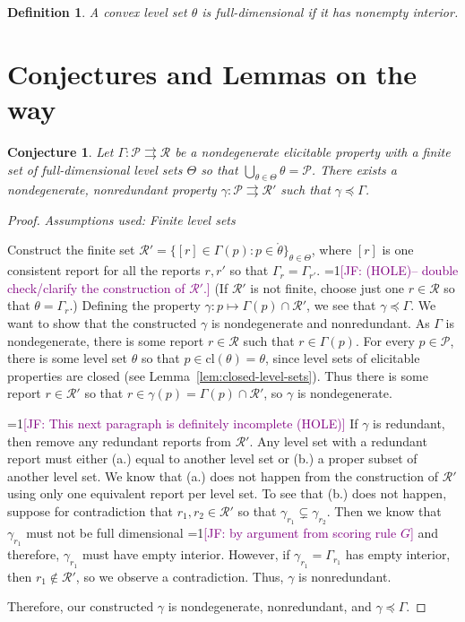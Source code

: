 \documentclass[12pt]{article}
\newcommand{\Comments}{1}
\newcommand{\mynote}[2]{\ifnum\Comments=1\textcolor{#1}{#2}\fi}
\newcommand{\jessie}[1]{\mynote{purple}{[JF: #1]}}
\renewcommand{\P}{\mathcal{P}}
\newcommand{\R}{\mathcal{R}}
\newcommand{\inter}[1]{\mathring{#1}}%
\newcommand{\cl}[1]{\text{cl}(#1)}
\newcommand{\toto}{\rightrightarrows}
\newtheorem{definition}{Definition}
\newtheorem{conjecture}{Conjecture}
\begin{document}
\begin{definition}
	A convex level set $\theta$ is \emph{full-dimensional} if it has nonempty interior.
\end{definition}



\section{Conjectures and Lemmas on the way}

\begin{conjecture}\label{conj:gam-prime-exists}
	Let $\Gamma:\P \toto \R$ be a nondegenerate elicitable property with a finite set of full-dimensional level sets $\Theta$ so that $\bigcup_{\theta \in \Theta}\theta = \P$.
	There exists a nondegenerate, nonredundant property $\gamma: \P \toto \R'$ such that $\gamma \preceq \Gamma$. 
\end{conjecture}
\begin{proof}
\emph{Assumptions used: Finite level sets}

	
	Construct the finite set $\R' = \{[r] \in \Gamma(p) : p \in \inter{\theta} \}_{\theta \in \Theta}$, where $[r]$ is one consistent report for all the reports $r, r'$ so that $\Gamma_r = \Gamma_{r'}$. 
	\jessie{(HOLE)-- double check/clarify the construction of $\R'$.}
	(If $\R'$ is not finite, choose just one $r \in \R$ so that $\theta = \Gamma_r$.)
	Defining the property $\gamma : p \mapsto \Gamma(p) \cap \R'$, we see that $\gamma \preceq \Gamma$.
	We want to show that the constructed $\gamma$ is nondegenerate and nonredundant.
	As $\Gamma$ is nondegenerate, there is some report $r \in \R$ such that $r \in \Gamma(p)$.
	For every $p \in \P$, there is some level set $\theta$ so that $p \in \cl{\theta} = \theta$, since level sets of elicitable properties are closed (see Lemma~\ref{lem:closed-level-sets}).
	Thus there is some report $r \in \R'$ so that $r \in \gamma(p) = \Gamma(p) \cap \R'$, so $\gamma$ is nondegenerate.

	\jessie{This next paragraph is definitely incomplete (HOLE)}
	If $\gamma$ is redundant, then remove any redundant reports from $\R'$.
	Any level set with a redundant report must either (a.) equal to another level set or (b.) a proper subset of another level set. 
	We know that (a.) does not happen from the construction of $\R'$ using only one equivalent report per level set.
	To see that (b.) does not happen, suppose for contradiction that $r_1, r_2 \in \R'$ so that $\gamma_{r_1}\subsetneq \gamma_{r_2}$.
	Then we know that $\gamma_{r_1}$ must not be full dimensional \jessie{by argument from scoring rule $G$} and therefore, $\gamma_{r_1}$ must have empty interior.
	However, if $\gamma_{r_1} = \Gamma_{r_1}$ has empty interior, then $r_1\not\in \R'$, so we observe a contradiction.
	Thus, $\gamma$ is nonredundant.
	
	Therefore, our constructed $\gamma$ is nondegenerate, nonredundant, and $\gamma \preceq \Gamma$.
	
\end{proof}
\end{document}
